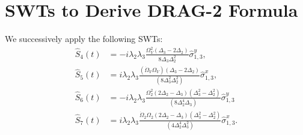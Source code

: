 \section{SWTs to Derive DRAG-2 Formula}
\label{appendix:DRAG2}
We successively apply the following SWTs:
\begin{align*}
  \hat{S}_4(t) & = -i\lambda_2\lambda_3\frac{\Omega_V^2(\Delta_3 -
  2\Delta_2)}{8\Delta_3\Delta_2^2}\hat{\sigma}_{1,3}^y,            \\
  \hat{S}_5(t) & =
  i\lambda_2\lambda_3\frac{(\dot{\Omega}_V\Omega_V)(\Delta_3 -
  2\Delta_2)}{(8\Delta_3^2\Delta_2^2)}\hat{\sigma}_{1,3}^x,        \\
  \hat{S}_6(t) & =
  -i\lambda_2\lambda_3\frac{\Omega_2^2(2\Delta_2 - \Delta_3)(\Delta_3^2 -
  \Delta_2^2)}{(8\Delta_2^4\Delta_3)}\hat{\sigma}_{1,3}^y          \\
  \hat{S}_7(t) & =
  i\lambda_2\lambda_3\frac{\dot{\Omega}_2\Omega_2(2\Delta_2 - \Delta_3)(\Delta_3^2 -
    \Delta_2^2)}{(4\Delta_2^4\Delta_3^2)}\hat{\sigma}_{1,3}^x.
\end{align*}

